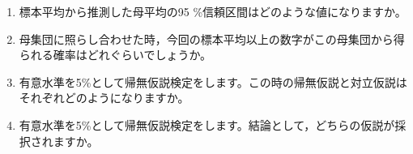 \begin{enumerate}
	\item 標本平均から推測した母平均の95 \%信頼区間はどのような値になりますか。
	\item 母集団に照らし合わせた時，今回の標本平均以上の数字がこの母集団から得られる確率はどれぐらいでしょうか。
	\item 有意水準を5\%として帰無仮説検定をします。この時の帰無仮説と対立仮説はそれぞれどのようになりますか。
	\item 有意水準を5\%として帰無仮説検定をします。結論として，どちらの仮説が採択されますか。
\end{enumerate}
